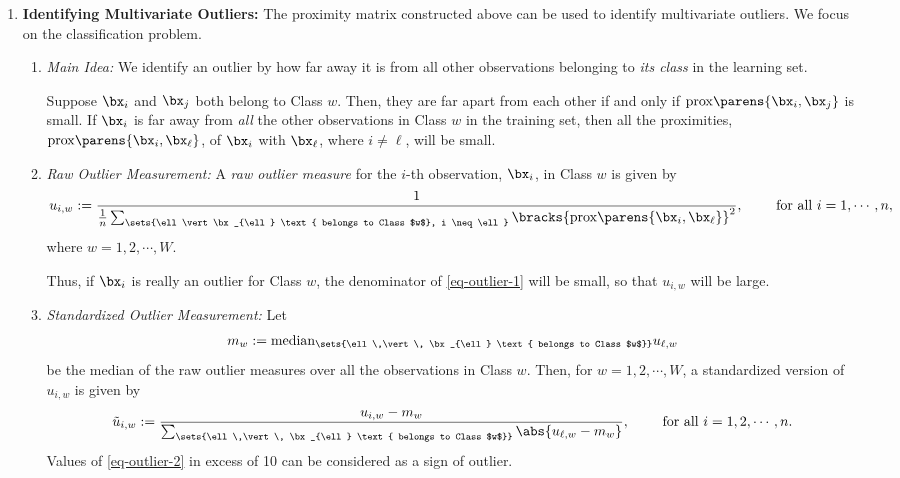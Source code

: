 \documentclass[12pt]{article}
\begin{document}
\begin{enumerate}[label=\textbf{\arabic*.}]
\begin{enumerate}
	\end{enumerate}
	
	\item \textbf{Identifying Multivariate Outliers:} The proximity matrix constructed above can be used to identify multivariate outliers. We focus on the classification problem. 
	\begin{enumerate}
		\item \textit{Main Idea:} We identify an outlier by how far away it is from all other observations belonging to \emph{its class} in the learning set. 
		
		Suppose $\bx_i$ and $\bx_j$ both belong to Class $w$. Then, they are far apart from each other if and only if $\mathrm{prox} \parens{\bx_i, \bx_j}$ is small. If $\bx_i$ is far away from \emph{all} the other observations in Class $w$ in the training set, then all the proximities, $\mathrm{prox} \parens{\bx_i, \bx_{\ell}}$, of $\bx_i$ with $\bx_{\ell}$, where $i \neq \ell$, will be small. 

		\item \textit{Raw Outlier Measurement:} A \textit{raw outlier measure} for the $i$-th observation, $\bx_i$, in Class $w$ is given by
		\begin{align}\label{eq-outlier-1}
			u_{i, w} := \frac{1}{\frac{1}{n} \sum_{\sets{\ell \vert \bx_{\ell} \text{ belongs to Class $w$}, i \neq \ell}} \bracks{\mathrm{prox} \parens{\bx_i, \bx_{\ell}}}^2}, \qquad \text{ for all } i = 1, \cdots, n, 
		\end{align}
		where $w = 1, 2, \cdots, W$. 
		
		Thus, if $\bx_i$ is really an outlier for Class $w$, the denominator of \eqref{eq-outlier-1} will be small, so that $u_{i, w}$ will be large. 
		
		\item \textit{Standardized Outlier Measurement:} Let 
		\begin{align*}
			m_w := \mathrm{median}_{\sets{\ell \,\vert\, \bx_{\ell} \text{ belongs to Class $w$}}} u_{\ell, w}
		\end{align*}
		be the median of the raw outlier measures over all the observations in Class $w$. Then, for $w = 1, 2, \cdots, W$, a standardized version of $u_{i, w}$ is given by
		\begin{align}\label{eq-outlier-2}
			\tilde{u}_{i, w} := \frac{u_{i, w} - m_w}{\sum_{\sets{\ell \,\vert\, \bx_{\ell} \text{ belongs to Class $w$}}} \abs{u_{\ell, w} - m_w}}, \qquad \text{ for all } i = 1, 2, \cdots, n. 
		\end{align}
		Values of \eqref{eq-outlier-2} in excess of 10 can be considered as a sign of outlier. 
		

\end{enumerate}
\end{enumerate}
\end{document}
